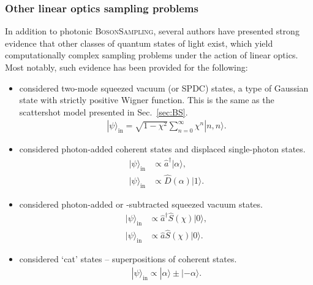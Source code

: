 \documentclass[aps, rmp, twocolumn, amsmath, amssymb, nofootinbib, superscriptaddress, longbibliography, floatfix, table-of-contents, eqsecnum]{revtex4-1}
\newcommand{\ket}[1]{|#1\rangle}
\begin{document}
%
%

\subsubsection{Other linear optics sampling problems} \label{sec:other_LO_samp_probs} 

In addition to photonic \textsc{BosonSampling}, several authors have presented strong evidence that other classes of quantum states of light exist, which yield computationally complex sampling problems under the action of linear optics. Most notably, such evidence has been provided for the following:
\begin{itemize}
\item \cite{bib:RandBS} considered two-mode squeezed vacuum (or SPDC) states, a type of Gaussian state with strictly positive Wigner function. This is the same as the scattershot model presented in Sec.~\ref{sec:BS}.
	\begin{align}
		\ket\psi_\text{in} = \sqrt{1-\chi^2}\sum_{n=0}^\infty \chi^n\ket{n,n}.
	\end{align}
\item \cite{bib:RohdeDisp15} considered photon-added coherent states and displaced single-photon states.
	\begin{align}
		\ket\psi_\text{in} &\propto \hat{a}^\dag\ket\alpha,\\
		\ket\psi_\text{in} &\propto \hat{D}(\alpha)\ket{1}.
	\end{align}
\item \cite{bib:RohdePhotAdd15} considered photon-added or -subtracted squeezed vacuum states.
	\begin{align}
		\ket\psi_\text{in} &\propto \hat{a}^\dag\hat{S}(\chi)\ket{0},\\
		\ket\psi_\text{in} &\propto \hat{a}\hat{S}(\chi)\ket{0}.
	\end{align}
\item \cite{bib:RohdeCat15} considered `cat' states -- superpositions of coherent states.
	\begin{align}
		\ket\psi_\text{in} \propto \ket\alpha \pm \ket{-\alpha}.
	\end{align}
\end{itemize}
\end{document}
